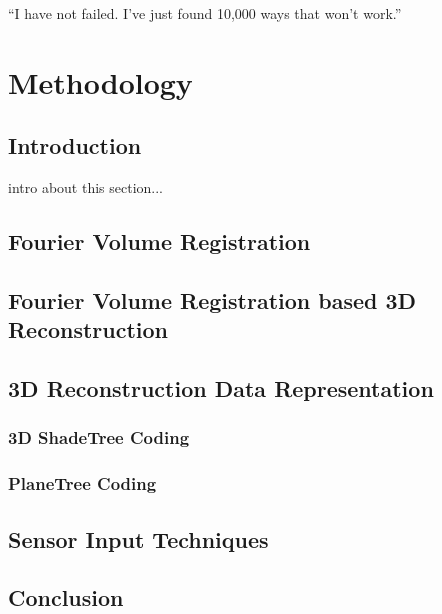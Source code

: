 \begin{savequote}[8cm]
  ``I have not failed. I've just found 10,000 ways that won't work.''
\end{savequote}
\makeatletter
\chapter{Methodology}

\section{Introduction}

intro about this section...

\section{Fourier Volume Registration} 







\section{Fourier Volume Registration based 3D Reconstruction}



\section{3D Reconstruction Data Representation}

\subsection{3D ShadeTree Coding}

\subsection{PlaneTree Coding}

\section{Sensor Input Techniques}



\section{Conclusion}